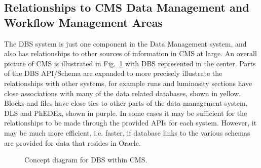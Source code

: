 \documentclass{cmspaper}
\begin{document}
\subsection{Relationships to CMS Data Management and Workflow Management Areas}


The DBS system is just one component in the Data Management system, and also has relationships to other sources of information in CMS at large. An overall picture of CMS is illustrated in Fig.~\ref{fig:dbs-context-diagram} with DBS represented in the center. Parts of the DBS API/Schema are expanded to more precisely illustrate the relationships with other systems, for example runs and luminosity sections have close associations with many of the data related databases, shown in yellow. Blocks and files have close ties to other parts of the data management system, DLS and PhEDEx, shown in purple. In some cases it may be sufficient for the relationships to be made through the provided APIs for each system. However, it may be much more efficient, i.e. faster, if database links to the various schemas are provided for data that resides in Oracle.

\begin{figure}[hbtp]
  \begin{center}
    \caption{Concept diagram for DBS within CMS.}
    \label{fig:dbs-context-diagram}
  \end{center}
\end{figure} 
\end{document}
